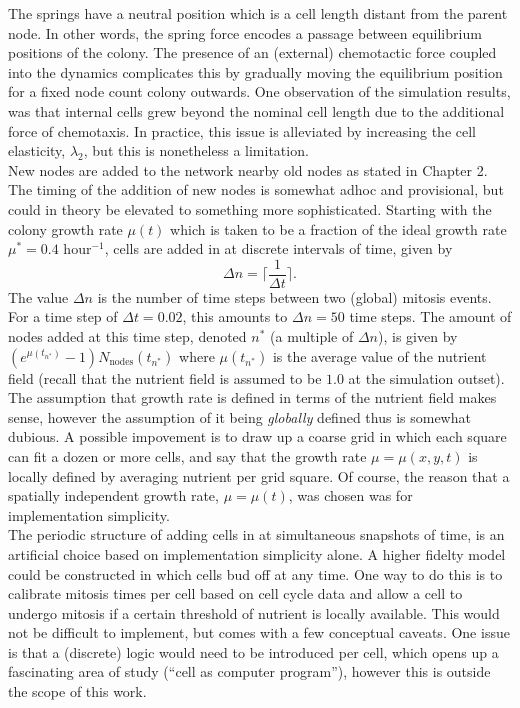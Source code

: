 The springs have a neutral position which is a cell length distant from the parent node.
In other words, the spring force encodes a passage between equilibrium positions of the colony.
The presence of an (external) chemotactic force coupled into the dynamics complicates 
this by gradually moving the equilibrium position for a fixed node count colony outwards.
One observation of the simulation results, was that internal cells grew beyond the nominal cell length
due to the additional force of chemotaxis. In practice,
this issue is alleviated by increasing the cell elasticity, $\lambda_2$, but this 
is nonetheless a limitation.
\\

New nodes are added to the network nearby old nodes as stated in Chapter 2. The timing
of the addition of new nodes is somewhat adhoc and provisional, but could in theory
be elevated to something more sophisticated. Starting with the colony growth rate 
$\mu(t)$ which is taken to be a fraction of the ideal growth rate $\mu^* = 0.4$ hour$^{-1}$,
cells are added in at discrete intervals of time, given by 
\begin{equation*}
    \Delta n = \bigg\lceil \frac{1}{\Delta t} \bigg\rceil.
\end{equation*}
The value $\Delta n$ is the number of time steps between two (global) mitosis events. For a
time step of $\Delta t = 0.02$, this amounts to $\Delta n = 50$ time steps. The amount of 
nodes added at this time step, denoted $n^*$ (a multiple of $\Delta n$), is given by 
$(e^{\mu(t_{n^*})} -1) N_{\textrm{nodes}}(t_{n^*})$ where $\mu (t_{n^*})$ 
is the average value of the nutrient field (recall that the nutrient field is assumed to 
be $1.0$ at the simulation outset). The assumption that growth rate is defined
in terms of the nutrient field makes sense, however the assumption of it being \textit{globally} 
defined thus is somewhat dubious. A possible impovement is to draw up a coarse 
grid in which each square can fit a dozen or more cells, and say that 
the growth rate $\mu = \mu(x,y,t)$ is locally defined by averaging nutrient per grid square. 
Of course, the reason 
that a spatially independent growth rate, $\mu = \mu(t)$, was chosen was for 
implementation simplicity.
\\

The periodic structure of adding cells in at simultaneous snapshots of time,
is an artificial choice based on implementation simplicity alone. 
A higher fidelty model could be constructed in which cells bud off at any time.
One way to do this is to calibrate mitosis times per cell based on cell cycle data
and allow a cell to undergo mitosis if a certain threshold of nutrient is locally
available. This would not be difficult to implement, but 
comes with a few conceptual caveats. One issue is that 
a (discrete) logic would need to be introduced per cell,
which opens up a fascinating area of study (``cell as computer program''), however 
this is outside the scope of this work.
\\

